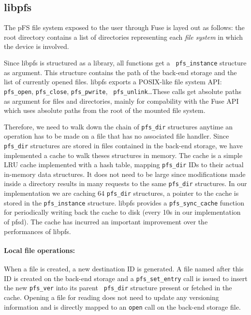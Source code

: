 \subsection {libpfs}

The pFS file system exposed to the user through Fuse is layed
out as follows: the root directory contains a list of directories
representing each \emph{file system} in which the device is
involved. 

Since libpfs is structured as a library, all functions get a {\tt
  pfs\_instance} structure as argument. This structure contains the
path of the back-end storage and the list of currently opened
files. libpfs exports a POSIX-like file system API: {\tt
  pfs\_open}, {\tt pfs\_close}, {\tt pfs\_pwrite}, {\tt
  pfs\_unlink}\ldots These calls get absolute paths as argument for
files and directories, mainly for compability with the Fuse API which
uses absolute paths from the root of the mounted file system.

Therefore, we need to walk down the chain of {\tt pfs\_dir} structures
anytime an operation has to be made on a file that has no associated
file handler. Since {\tt pfs\_dir} structures are stored in files
contained in the back-end storage, we have implemented a cache to walk
theses structures in memory. 
The cache is a simple LRU cache implemented with a hash table, mapping
{\tt pfs\_dir} IDs to their actual in-memory data structures. It does
not need to be large since modifications made inside a directory
results in many requests to the same {\tt pfs\_dir} structures. In our
implementation we are caching 64 {\tt pfs\_dir} structures, a pointer
to the cache is stored in the {\tt pfs\_instance} structure. libpfs
provides a {\tt pfs\_sync\_cache} function for periodically writing
back the cache to disk (every 10s in our implementation of pfsd). The
cache has incurred an important improvement over the performances of
libpfs.

\paragraph{Local file operations:}
When a file is created, a new destination ID is generated. A file named
after this ID is created on the back-end storage and a {\tt pfs\_set\_entry}
call is issued to insert the new {\tt pfs\_ver} into its parent {\tt
  pfs\_dir} structure present or fetched in the cache.  Opening a file
for reading does not need to update any versioning information and is
directly mapped to an {\tt open} call on the back-end storage file.

